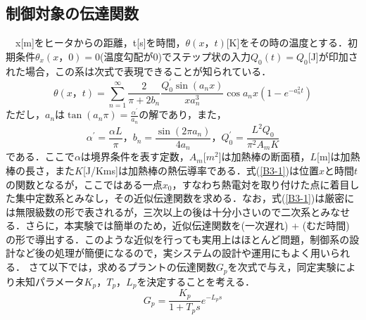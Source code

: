 \documentclass[12pt]{jsarticle}
\begin{document}
\subsection{制御対象の伝達関数}
　x[m]をヒータからの距離，t[s]を時間，$\theta(x，t)$[K]をその時の温度とする．初期条件$\theta_x(x，0)=0$(温度勾配が0)でステップ状の入力$Q_0(t)=Q_0$[J]が印加された場合，この系は次式で表現できることが知られている．
\begin{equation}
  \label{B3-1}
  \theta(x，t) = \sum_{n=1}^{\infty}\frac{2}{\pi+2b_n}\frac{Q_0^{\prime}\sin(a_nx)}{xa_n^3}\cos{a_nx(1-e^{-a_n^2t})}
\end{equation}
ただし，$a_n$は$\tan(a_n\pi) = \frac{\alpha^{\prime}}{a_n}$の解であり，また，
\begin{displaymath}
  \alpha^{\prime} = \frac{\alpha L}{\pi}， b_n = \frac{\sin(2\pi a_n)}{4a_n}， Q_0^{\prime} = \frac{L^2Q_0}{\pi^2A_mK}
\end{displaymath}
である．ここで$\alpha$は境界条件を表す定数，$A_m$[$m^2$]は加熱棒の断面積，$L$[m]は加熱棒の長さ，また$K$[J/Kms]は加熱棒の熱伝導率である．式(\ref{B3-1})は位置$x$と時間$t$の関数となるが，ここではある一点$x_0$，すなわち熱電対を取り付けた点に着目した集中定数系とみなし，その近似伝達関数を求める．なお，式(\ref{B3-1})は厳密には無限級数の形で表されるが，三次以上の後は十分小さいので二次系とみなせる．さらに，本実験では簡単のため，近似伝達関数を(一次遅れ) + (むだ時間) の形で導出する．このような近似を行っても実用上はほとんど問題，制御系の設計など後の処理が簡便になるので，実システムの設計や運用にもよく用いられる．
さて以下では，求めるプラントの伝達関数$G_p$を次式で与え，同定実験により未知パラメータ$K_p$，$T_p$，$L_p$を決定することを考える．
\begin{equation}
  \label{B3-2}
  G_p = \frac{K_p}{1+T_ps}e^{-L_ps}
\end{equation}

%
\end{document}
